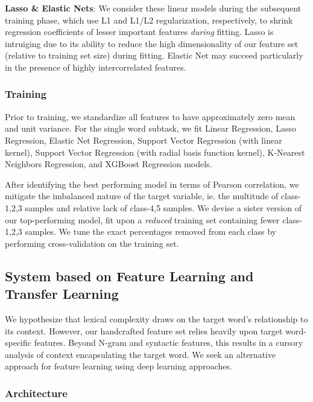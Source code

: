 \documentclass[11pt,a4paper]{article}
\begin{document}
\textbf{Lasso \& Elastic Nets}: We consider these linear models during the subsequent training phase, which use L1 and L1/L2 regularization, respectively, to shrink regression coefficients of lesser important features \textit{during} fitting. Lasso \citep{Tibshirani.x} is intruiging due to its ability to reduce the high dimensionality of our feature set (relative to training set size) during fitting. Elastic Net \citep{10.2307/3647580} may succeed particularly in the presence of highly intercorrelated features.

\subsubsection{Training}

Prior to training, we standardize all features to have approximately zero mean and unit variance. For the single word subtask, we fit Linear Regression, Lasso Regression, Elastic Net Regression, Support Vector Regression (with linear kernel),  Support Vector Regression (with radial basis function kernel), K-Nearest Neighbors Regression, and XGBoost Regression models. 

After identifying the best performing model in terms of Pearson correlation, we mitigate the imbalanced nature of the target variable, ie. the multitude of class-1,2,3 samples and relative lack of class-4,5 samples. We devise a sister version of our top-performing model, fit upon a \textit{reduced} training set containing fewer class-1,2,3 samples. We tune the exact percentages removed from each class by performing cross-validation on the training set.

\subsection{System based on Feature Learning and Transfer Learning}

We hypothesize that lexical complexity draws on the target word's relationship to its context. However, our handcrafted feature set relies heavily upon target word-specific features. Beyond N-gram and syntactic features, this results in a cursory analysis of context encapsulating the target word. We seek an alternative approach for feature learning using deep learning approaches.

\subsubsection{Architecture}
\end{document}
